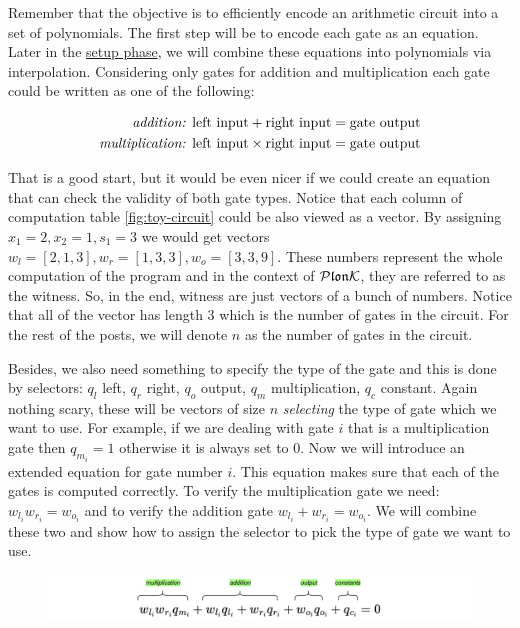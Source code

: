 Remember that the objective is to efficiently encode an arithmetic circuit into a set of polynomials. The first step will be to encode each gate as an equation. Later in the \hyperref[chap:round0]{setup phase}, we will combine these equations into polynomials via interpolation. Considering only gates for addition and multiplication each gate could be written as one of the following:

\begin{align}
    \label{eq:primitive_gate_constraints}
    \text{\textit{addition:} } \text{left input} + \text{right input} = \text{gate output} 
    \\
    \text{\textit{multiplication:} } \text{left input} \times \text{right input} = \text{gate output}
\end{align}

That is a good start, but it would be even nicer if we could create an equation that can check the validity of both gate types. Notice that each column of computation table \eqref{fig:toy-circuit} could be also viewed as a vector. By assigning $x_1 = 2, x_2 = 1, s_1 = 3$ we would get vectors $w_l = [2, 1, 3], w_r = [1, 3, 3], w_o = [3, 3, 9]$. These numbers represent the whole computation of the program and in the context of $\mathcal{P}\mathfrak{lon}\mathcal{K}$, they are referred to as the witness. So, in the end, witness are just vectors of a bunch of numbers. Notice that all of the vector has length 3 which is the number of gates in the circuit. For the rest of the posts, we will denote $n$ as the number of gates in the circuit.

Besides, we also need something to specify the type of the gate and this is done by selectors: $q_l$ left, $q_r$ right, $q_o$ output, $q_m$ multiplication, $q_c$ constant. Again nothing scary, these will be vectors of size $n$ \textit{selecting} the type of gate which we want to use. For example, if we are dealing with gate $i$ that is a multiplication gate then $q_{m_i} = 1$ otherwise it is always set to 0.
Now we will introduce an extended equation for gate number $i$. This equation makes sure that each of the gates is computed correctly. To verify the multiplication gate we need: $w_{l_i}w_{r_i} = w_{o_i}$ and to verify the addition gate $w_{l_i}+w_{r_i} = w_{o_i}$. We will combine these two and show how to assign the selector to pick the type of gate we want to use.

\begin{figure}
    \centering
    \includegraphics[width=1\linewidth]{figures/gate_equation.drawio.png}
\end{figure}

